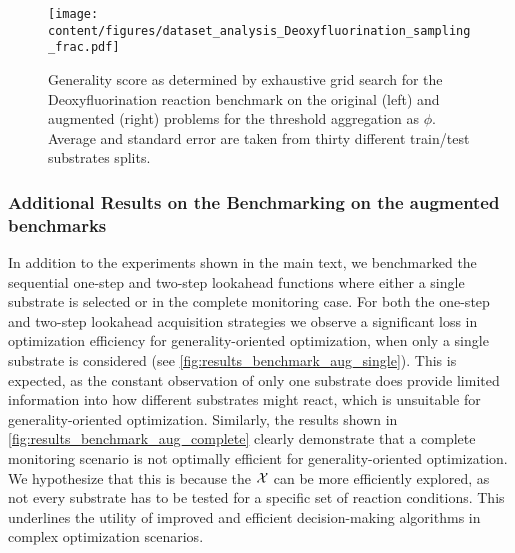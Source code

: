\begin{figure}[t]
    \centering
    \texttt{[image: content/figures/dataset\_analysis\_Deoxyfluorination\_sampling\_frac.pdf]}
    \caption{Generality score as determined by exhaustive grid search for the Deoxyfluorination reaction benchmark on the original (left) and augmented (right) problems for the threshold aggregation as $\phi$. Average and standard error are taken from thirty different train/test substrates splits.}
    \label{fig:results_dataset-analysis_Deoxyfluorination_combined_frac}
\end{figure}

\subsubsection{Additional Results on the Benchmarking on the augmented benchmarks}\label{subsubsec:add_results_augmented}

In addition to the experiments shown in the main text, we benchmarked the sequential one-step and two-step lookahead functions where either a single substrate is selected or in the complete monitoring case.
For both the one-step and two-step lookahead acquisition strategies we observe a significant loss in optimization efficiency for generality-oriented optimization, when only a single substrate is considered (see \cref{fig:results_benchmark_aug_single}).
This is expected, as the constant observation of only one substrate does provide limited information into how different substrates might react, which is unsuitable for generality-oriented optimization.
Similarly, the results shown in \cref{fig:results_benchmark_aug_complete} clearly demonstrate that a complete monitoring scenario is not optimally efficient for generality-oriented optimization.
We hypothesize that this is because the ${\mathcal{X}}$ can be more efficiently explored, as not every substrate has to be tested for a specific set of reaction conditions.
This underlines the utility of improved and efficient decision-making algorithms in complex optimization scenarios.

